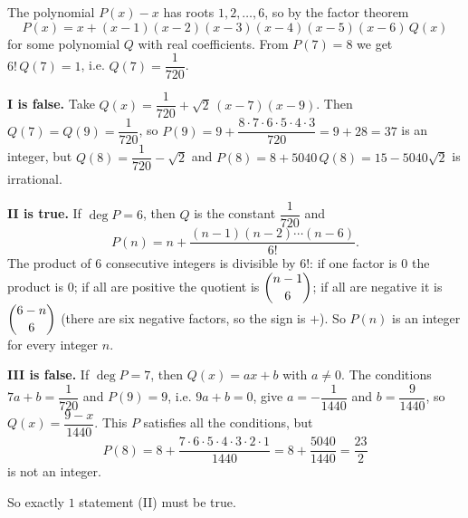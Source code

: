 The polynomial $P(x)-x$ has roots $1,2,\dots,6$, so by the factor theorem
\[P(x)=x+(x-1)(x-2)(x-3)(x-4)(x-5)(x-6)\,Q(x)\]
for some polynomial $Q$ with real coefficients. From $P(7)=8$ we get $6!\,Q(7)=1$, i.e. $Q(7)=\dfrac{1}{720}$.

\textbf{I is false.} Take $Q(x)=\dfrac{1}{720}+\sqrt2\,(x-7)(x-9)$. Then $Q(7)=Q(9)=\dfrac{1}{720}$, so $P(9)=9+\dfrac{8\cdot7\cdot6\cdot5\cdot4\cdot3}{720}=9+28=37$ is an integer, but $Q(8)=\dfrac{1}{720}-\sqrt2$ and $P(8)=8+5040\,Q(8)=15-5040\sqrt2$ is irrational.

\textbf{II is true.} If $\deg P=6$, then $Q$ is the constant $\dfrac{1}{720}$ and
\[P(n)=n+\dfrac{(n-1)(n-2)\cdots(n-6)}{6!}.\]
The product of $6$ consecutive integers is divisible by $6!$: if one factor is $0$ the product is $0$; if all are positive the quotient is $\dbinom{n-1}{6}$; if all are negative it is $\dbinom{6-n}{6}$ (there are six negative factors, so the sign is $+$). So $P(n)$ is an integer for every integer $n$.

\textbf{III is false.} If $\deg P=7$, then $Q(x)=ax+b$ with $a\ne0$. The conditions $7a+b=\dfrac{1}{720}$ and $P(9)=9$, i.e. $9a+b=0$, give $a=-\dfrac{1}{1440}$ and $b=\dfrac{9}{1440}$, so $Q(x)=\dfrac{9-x}{1440}$. This $P$ satisfies all the conditions, but
\[P(8)=8+\dfrac{7\cdot6\cdot5\cdot4\cdot3\cdot2\cdot1}{1440}=8+\dfrac{5040}{1440}=\dfrac{23}{2}\]
is not an integer.

So exactly $\boxed{1}$ statement (II) must be true.
